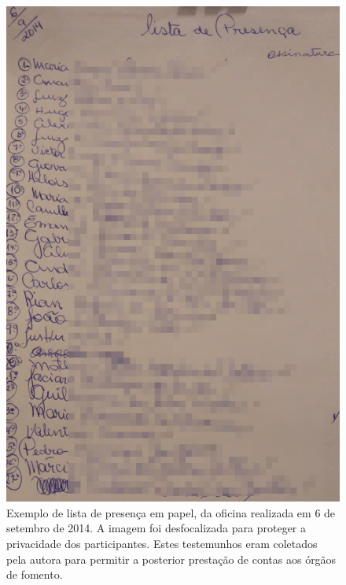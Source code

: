 \documentclass[
12pt,		%
openright,	%
twoside,  %
a4paper,			%
chapter=TITLE,		%
english,			%
french,				%
spanish,			%
brazil				%
]{USPSC-classe/USPSC}
\begin{document}
\begin{figure}[max size={\textwidth}{\textheight}]
\begin{minipage}[b]{0.4\linewidth}
                \caption{Testemunhos de presen\c{c}a de estudantes do fundamental em eventos do Programa WASH coletados pela autora. O exemplo \'e de uma oficina em 23 de agosto de 2014. Nos prim\'ordios do projeto eram usados registros na forma de listas de presen\c{c}a em folhas de papel. A imagem foi desfocalizada para proteger a privacidade dos participantes.}
                \label{dec219c809788f521312f8d75d2f5591f069f132}
\end{minipage}%
\hspace{0.5cm}
\begin{minipage}[b]{0.4\linewidth}
        \centering
                \includegraphics[width=1.0\linewidth]{../../imagens/blurred-Presenca-Oficina-2014-09-06.jpeg}
                \caption{Exemplo de lista de presen\c{c}a em papel, da oficina realizada em 6 de setembro de 2014. A imagem foi desfocalizada para proteger a privacidade dos participantes. Estes testemunhos eram coletados pela autora para permitir a posterior presta\c{c}\~ao de contas aos \'org\~aos de fomento.}

\end{minipage}
\end{figure}
\end{document}
